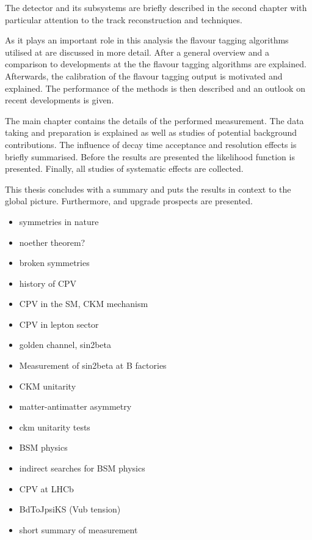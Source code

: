 The \LHCb detector and its subsystems are briefly described in the second
chapter with particular attention to the track reconstruction and \PID
techniques.

As it plays an important role in this analysis the flavour tagging algorithms
utilised at \LHCb are discussed in more detail. After a general overview and a
comparison to developments at the \BFactories the flavour tagging algorithms are
explained. Afterwards, the calibration of the flavour tagging output is
motivated and explained. The performance of the methods is then described and
an outlook on recent developments is given.

The main chapter contains the details of the performed measurement. The data
taking and preparation is explained as well as studies of potential background
contributions. The influence of decay time acceptance and resolution effects is
briefly summarised. Before the results are presented the likelihood function is
presented. Finally, all studies of systematic effects are collected.

This thesis concludes with a summary and puts the results in context to the
global \CKM picture. Furthermore, \RunTwo and \LHCb upgrade prospects are
presented.

\begin{itemize}
  \item symmetries in nature
  \item noether theorem?
  \item broken symmetries
  \item history of CPV
  \item CPV in the SM, CKM mechanism
  \item CPV in lepton sector
  \item golden channel, sin2beta
  \item Measurement of sin2beta at B factories
  \item CKM unitarity
  \item matter-antimatter asymmetry
  \item ckm unitarity tests
  \item BSM physics
  \item indirect searches for BSM physics
  \item CPV at LHCb
  \item BdToJpsiKS (Vub tension)
  \item short summary of measurement
\end{itemize}
